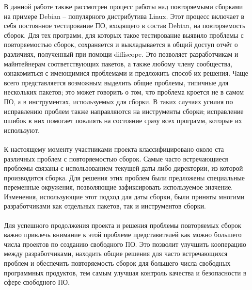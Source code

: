 В данной работе также рассмотрен процесс работы над повторяемыми сборками на примере Debian -- популярного дистрибутива Linux. Этот процесс включает в себя постоянное тестирование ПО, входящего в состав Debian, на повторяемость сборок. Для тех программ, для которых такое тестирование выявило проблемы с повторяемостью сборок, сохраняется и выкладывается в общий доступ отчёт о различиях, полученный при помощи diffiscope. Это позволяет разработчикам и майнтейнерам соответствующих пакетов, а также любому члену сообщества, ознакомиться с имеющимися проблемами и предложить способ их решения. Чаще всего представляется возможным выделить общие проблемы, типичные для нескольких пакетов; это может говорить о том, что проблема кроется не в самом ПО, а в инструментах, используемых для сборки. В таких случаях усилия по исправлению проблем также направляются на инструменты сборки; исправление ошибок в них помогает повлиять на состояние сразу всех программ, которые их используют.\\\\
К настоящему моменту участниками проекта классифицировано около ста различных проблем с повторяемостью сборок. Самые часто встречающиеся проблемы связаны с использованием текущей даты либо директории, из которой производится сборка. Для решения этих проблем были предложены специальные переменные окружения, позволяющие зафиксировать используемое значение. Изменения, использующие этот подход для даты сборки, были приняты многими разработчиками как отдельных пакетов, так и инструментов сборки.\\\\
Для успешного продолжения проекта и решения проблемы повторяемых сборок важно привлечь внимание к этой проблеме представителей как можно большего числа проектов по созданию свободного ПО. Это позволит улучшить кооперацию между разработчиками, находить общие решения для часто встречающихся проблем и обеспечить повторяемость сборок для большего числа свободных программных продуктов, тем самым улучшая контроль качества и безопасности в сфере свободного ПО.\\\\

